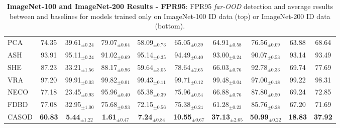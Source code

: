 \begin{table}[t!]
{\begin{tabular}{|l|c|cccccc|c|c|}
PCA    &  74.35 & 39.61$_{\pm 0.24}$ & 79.07$_{\pm 0.64}$ & 58.09$_{\pm 0.73}$ & 65.05$_{\pm 0.39}$ & 64.91$_{\pm 0.58}$ & 76.56$_{\pm 0.09}$ & 63.88 & 68.64 \\
ASH    & 93.91 & 95.11$_{\pm 0.24}$ & 91.02$_{\pm 0.69}$ & 95.14$_{\pm 0.35}$ & 94.49$_{\pm 0.40}$ & 93.00$_{\pm 0.24}$ & 90.07$_{\pm 0.53}$ & 93.14 & 93.49 \\
SHE    &  87.23 & 33.21$_{\pm 1.56}$ & 88.17$_{\pm 0.96}$ & 59.64$_{\pm 3.05}$ & 78.64$_{\pm 2.65}$ & 66.03$_{\pm 0.76}$ & 92.78$_{\pm 0.33}$ & 69.74 & 77.69 \\
VRA    &  97.20 & 99.91$_{\pm 0.03}$ & 99.82$_{\pm 0.01}$ & 99.43$_{\pm 0.11}$ & 99.71$_{\pm 0.12}$ & 99.48$_{\pm 0.04}$ & 97.00$_{\pm 0.18}$ & 99.22 & 98.31 \\
NECO   &  77.18 & 23.45$_{\pm 0.93}$ & 95.96$_{\pm 0.40}$ & 65.38$_{\pm 0.39}$ & 75.96$_{\pm 0.54}$ & 66.88$_{\pm 0.76}$ & 87.80$_{\pm 0.50}$ & 69.24 & 72.85 \\
FDBD   &  77.08 & 32.95$_{\pm 1.00}$ & 75.68$_{\pm 0.93}$ & 72.15$_{\pm 0.56}$ & 75.38$_{\pm 0.24}$ & 61.28$_{\pm 0.23}$ & 85.76$_{\pm 0.28}$ & 67.20 & 71.69 \\ \hline
CASOD  &  \textbf{60.83} &  \textbf{5.44}$_{\pm 1.22}$ &  \textbf{1.61}$_{\pm 0.47}$ &  \textbf{7.24}$_{\pm 0.84}$ & \textbf{10.55}$_{\pm 0.67}$ & \textbf{37.13}$_{\pm 2.65}$ & \textbf{50.99}$_{\pm 0.22}$ & \textbf{18.83} & \textbf{37.92} \\ \hline
		\end{tabular}
	}
	\caption{\textbf{ImageNet-100 and ImageNet-200 Results - FPR95}: FPR95 \textit{far-OOD} detection and average results between \sys and baselines for models trained only on ImageNet-100 ID data (top) or ImageNet-200 ID data (bottom).
	}
	\label{tab:table_ood_fpr95_f}
\end{table}

